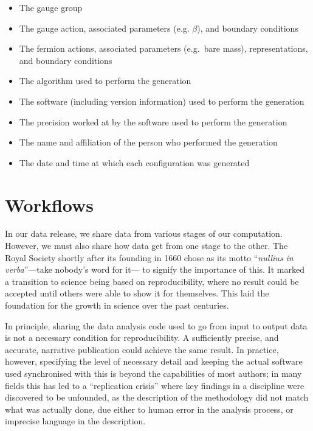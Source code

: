 \documentclass{article}
\begin{document}
\begin{itemize}
  \item
        The gauge group
  \item
        The gauge action, associated parameters (e.g. $\beta$), and boundary conditions
  \item
        The fermion actions, associated parameters (e.g.\ bare mass), representations, and boundary conditions
  \item
        The algorithm used to perform the generation
  \item
        The software (including version information) used to perform the generation
  \item
        The precision worked at by the software used to perform the generation
  \item
        The name and affiliation of the person who performed the generation
  \item
        The date and time at which each configuration was generated
\end{itemize}


\section{Workflows}\label{sec:workflows}

In our data release,
we share data from various stages of our computation.
However,
we must also share how data get from one stage to the other.
The Royal Society shortly after its founding in 1660
chose as its motto ``\emph{nullius in verba}''---take nobody's word for it---
to signify the importance of this.
It marked a transition to science being based on reproducibility,
where no result could be accepted until others were able to show it for themselves.
This laid the foundation for the growth in science over the past centuries.

In principle,
sharing the data analysis code used to go from input to output data
is not a necessary condition for reproducibility.
A sufficiently precise,
and accurate,
narrative publication
could achieve the same result.
In practice,
however,
specifying the level of necessary detail
and keeping the actual software used synchronised with this
is beyond the capabilities of most authors;
in many fields this has led to a ``replication crisis''
where key findings in a discipline were discovered to be unfounded,
as the description of the methodology did not match what was actually done,
due either to human error in the analysis process,
or imprecise language in the description.
\end{document}
